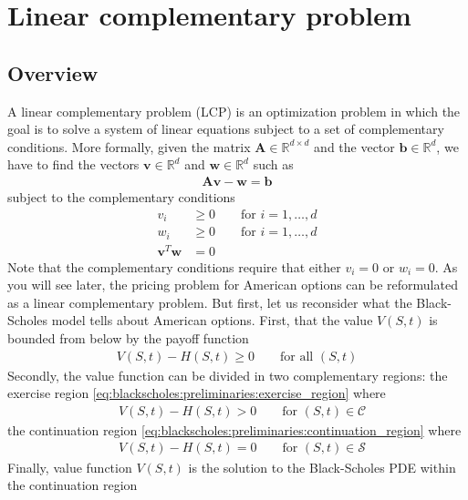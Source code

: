 \section{Linear complementary problem}
\subsection{Overview}
A linear complementary problem (LCP) is an optimization problem in which the goal is to solve a system of linear equations subject to a set of complementary conditions. More formally, given the matrix $\mathbf{A}\in\mathbb{R}^{d \times d}$ and the vector $\mathbf{b}\in\mathbb{R}^{d}$, we have to find the vectors $\mathbf{v}\in\mathbb{R}^{d}$ and $\mathbf{w}\in\mathbb{R}^{d}$ such as
\begin{align*}
  \mathbf{A}\mathbf{v} - \mathbf{w} = \mathbf{b}
\end{align*}
subject to the complementary conditions 
\begin{align*}
  v_i &\ge 0 \qquad \text{for $i = 1,\dots,d$} \\
  w_i &\ge 0 \qquad \text{for $i = 1,\dots,d$} \\
  \mathbf{v}^{T}\mathbf{w} &= 0
\end{align*}
Note that the complementary conditions require that either $v_i=0$ or $w_i=0$. As you will see later, the pricing problem for American options can be reformulated as a linear complementary problem. But first, let us reconsider what the Black-Scholes model tells about American options. First, that the value $V(S,t)$ is bounded from below by the payoff function 
\begin{align*}
  V(S, t) - H(S, t) \ge 0 \qquad \text{for all $(S,t)$}
\end{align*}
Secondly, the value function can be divided in two complementary regions: the exercise region \eqref{eq:blackscholes:preliminaries:exercise_region} where  
\begin{align}
  \label{eq:lcp:overview:value_in_continuation_region}
  &V(S, t) - H(S, t) > 0 \qquad \text{for $(S,t) \in \mathcal{C}$}
\end{align}
the continuation region \eqref{eq:blackscholes:preliminaries:continuation_region} where 
\begin{align}
  \label{eq:lcp:overview:value_in_exercise_region}
  &V(S, t) - H(S, t) = 0 \qquad \text{for $(S,t) \in \mathcal{S}$}
\end{align}
Finally, value function $V(S,t)$ is the solution to the Black-Scholes PDE  within the continuation region
